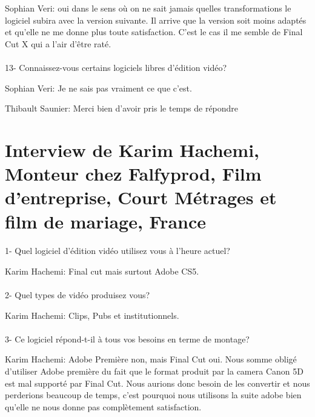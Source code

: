 Sophian Veri: oui dans le sens où on ne sait jamais quelles transformations le
logiciel subira avec la version suivante. Il arrive que la version soit moins adaptés
et qu'elle ne me donne plus toute satisfaction. C'est le cas il me semble de Final Cut
X qui a l'air d'être raté.

\paragraph{}
13- Connaissez-vous certains logiciels libres d'édition vidéo?

Sophian Veri: Je ne sais pas vraiment ce que c'est.

Thibault Saunier: Merci bien d'avoir pris le temps de répondre

\newpage\section*{Interview de Karim Hachemi, Monteur chez Falfyprod, Film d'entreprise,
Court Métrages et film de mariage, France}

\paragraph{}
1-  Quel logiciel d'édition vidéo utilisez vous à l'heure actuel?

Karim Hachemi: Final cut mais surtout Adobe CS5.

\paragraph{}
2- Quel types de vidéo produisez vous?

Karim Hachemi: Clips, Pubs et institutionnels.

\paragraph{}
3- Ce logiciel répond-t-il à tous vos besoins en terme de montage?

Karim Hachemi: Adobe Première non, mais Final Cut oui.
Nous somme obligé d'utiliser Adobe première du fait que
le format produit par la camera Canon 5D est mal supporté par Final Cut.
Nous aurions donc besoin de les convertir et nous perderions beaucoup de
temps, c'est pourquoi nous utilisons la suite adobe bien qu'elle ne nous donne
pas complètement satisfaction.

\paragraph{}

